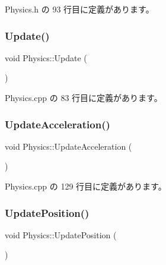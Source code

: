  Physics.\+h の 93 行目に定義があります。

\mbox{\label{class_physics_a13bf3e9de07a12afc3c0a4012e00d0a1}} 
\subsubsection{\texorpdfstring{Update()}{Update()}}
{\footnotesize\ttfamily void Physics\+::\+Update (\begin{DoxyParamCaption}{ }\end{DoxyParamCaption})}



 Physics.\+cpp の 83 行目に定義があります。

\mbox{\label{class_physics_a122041053c2c4e69cdf6dc92076e1d79}} 
\subsubsection{\texorpdfstring{Update\+Acceleration()}{UpdateAcceleration()}}
{\footnotesize\ttfamily void Physics\+::\+Update\+Acceleration (\begin{DoxyParamCaption}{ }\end{DoxyParamCaption})\hspace{0.3cm}{\ttfamily [private]}}



 Physics.\+cpp の 129 行目に定義があります。

\mbox{\label{class_physics_a481f06d777c1b1f52dc2c06c71e93932}} 
\subsubsection{\texorpdfstring{Update\+Position()}{UpdatePosition()}}
{\footnotesize\ttfamily void Physics\+::\+Update\+Position (\begin{DoxyParamCaption}{ }\end{DoxyParamCaption})\hspace{0.3cm}{\ttfamily [private]}}



